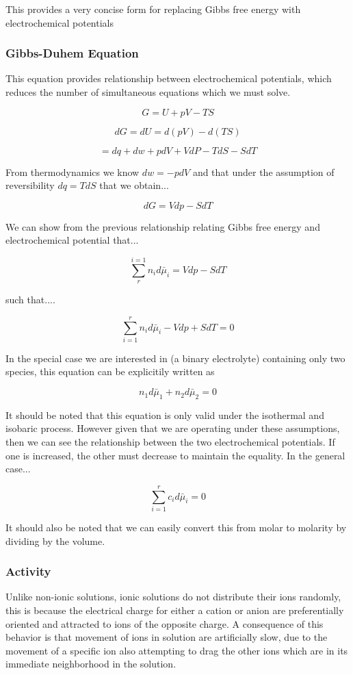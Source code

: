 \documentclass[lettersize,journal]{IEEEtran}
\begin{document}
This provides a very concise form for replacing Gibbs free energy with electrochemical potentials

\subsubsection{Gibbs-Duhem Equation}

This equation provides relationship between electrochemical potentials, which reduces the number of simultaneous equations which we must solve.

\[
    G = U + pV - TS
\]

\[
    dG = dU = d(pV) - d(TS)
\]

\[
        = dq + dw + pdV + VdP -TdS - SdT
\]

From thermodynamics we know $dw = -pdV$ and that under the assumption of reversibility $dq = TdS$ that we obtain...

\[
    dG = Vdp - SdT
\]

We can show from the previous relationship relating Gibbs free energy and electrochemical potential that...

\[
    \sum_{r}^{i=1} n_id\bar{\mu}_i = Vdp - SdT
\]

such that....

\[
    \sum_{i=1}^{r} n_id\bar{\mu}_i - Vdp + SdT = 0
\]

In the special case we are interested in (a binary electrolyte) containing only two species, this equation can be explicitily written as

\[
    n_1 d\bar{\mu}_1 + n_2 d\bar{\mu}_2 = 0
\]


It should be noted that this equation is only valid under the isothermal and isobaric process. However given that we are operating under these assumptions, then we can see the relationship between the two electrochemical potentials. If one is increased, the other must decrease to maintain the equality. In the general case...

\[
    \sum_{i=1}^{r} c_{i}d\bar{\mu}_i = 0
\]

It should also be noted that we can easily convert this from molar to molarity by dividing by the volume. \\

\subsubsection{Activity}

Unlike non-ionic solutions, ionic solutions do not distribute their ions randomly, this is because the electrical charge for either a cation or anion are preferentially oriented and attracted to ions of the opposite charge. A consequence of this behavior is that movement of ions in solution are artificially slow, due to the movement of a specific ion also attempting to drag the other ions which are in its immediate neighborhood in the solution. \\
\end{document}
